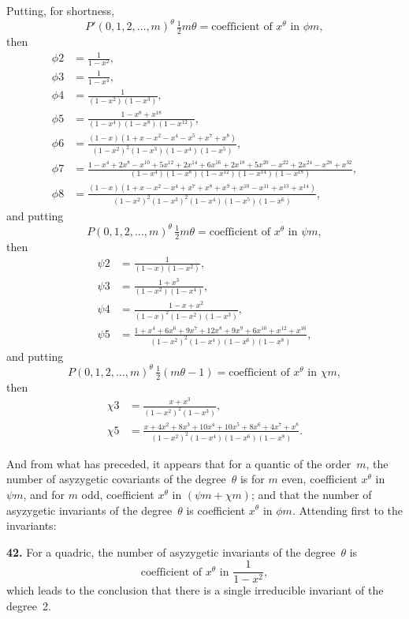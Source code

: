 \documentclass[11pt]{article}
\begin{document}
Putting, for shortness,
\[
P'(0, 1, 2, \ldots, m)^\theta\,\tfrac{1}{2}m\theta = \text{coefficient of } x^\theta \text{ in } \phi m,
\]
then
\begin{align*}
\phi 2 &= \frac{1}{1-x^2}, \\
\phi 3 &= \frac{1}{1-x^4}, \\
\phi 4 &= \frac{1}{(1-x^2)(1-x^3)}, \\
\phi 5 &= \frac{1 - x^8 + x^{18}}{(1-x^4)(1-x^8)(1-x^{12})}, \\
\phi 6 &= \frac{(1-x)(1+x-x^2-x^4-x^5+x^7+x^8)}{(1-x^2)^2(1-x^3)(1-x^4)(1-x^5)}, \\
\phi 7 &= \frac{1 - x^4 + 2x^8 - x^{10} + 5x^{12} + 2x^{14} + 6x^{16} + 2x^{18} + 5x^{20} - x^{22} + 2x^{24} - x^{28} + x^{32}}{(1-x^4)(1-x^8)(1-x^{12})(1-x^{14})(1-x^{18})}, \\
\phi 8 &= \frac{(1-x)(1+x-x^2-x^4+x^7+x^8+x^9+x^{10}-x^{11}+x^{13}+x^{14})}{(1-x^2)^2(1-x^3)^2(1-x^4)(1-x^5)(1-x^6)},
\end{align*}
and putting
\[
P(0, 1, 2, \ldots, m)^\theta\,\tfrac{1}{2}m\theta = \text{coefficient of } x^\theta \text{ in } \psi m,
\]
then
\begin{align*}
\psi 2 &= \frac{1}{(1-x)(1-x^2)}, \\
\psi 3 &= \frac{1+x^3}{(1-x^2)(1-x^4)}, \\
\psi 4 &= \frac{1-x+x^2}{(1-x)^2(1-x^2)(1-x^3)}, \\
\psi 5 &= \frac{1 + x^4 + 6x^6 + 9x^7 + 12x^8 + 9x^9 + 6x^{10} + x^{12} + x^{16}}{(1-x^2)^2(1-x^4)(1-x^6)(1-x^8)},
\end{align*}
and putting
\[
P(0, 1, 2, \ldots, m)^\theta\,\tfrac{1}{2}(m\theta - 1) = \text{coefficient of } x^\theta \text{ in } \chi m,
\]
then
\begin{align*}
\chi 3 &= \frac{x + x^3}{(1-x^2)^2(1-x^3)}, \\
\chi 5 &= \frac{x + 4x^2 + 8x^3 + 10x^4 + 10x^5 + 8x^6 + 4x^7 + x^8}{(1-x^2)^2(1-x^4)(1-x^6)(1-x^8)}.
\end{align*}

And from what has preceded, it appears that for a quantic of the order~$m$, the number of asyzygetic covariants of the degree~$\theta$ is for $m$ even, coefficient $x^\theta$ in $\psi m$, and for $m$ odd, coefficient $x^\theta$ in $(\psi m + \chi m)$; and that the number of asyzygetic invariants of the degree~$\theta$ is coefficient $x^\theta$ in $\phi m$. Attending first to the invariants:

\textbf{42.} For a quadric, the number of asyzygetic invariants of the degree~$\theta$ is
\[
\text{coefficient of } x^\theta \text{ in } \frac{1}{1-x^2},
\]
which leads to the conclusion that there is a single irreducible invariant of the degree~2.
\end{document}
